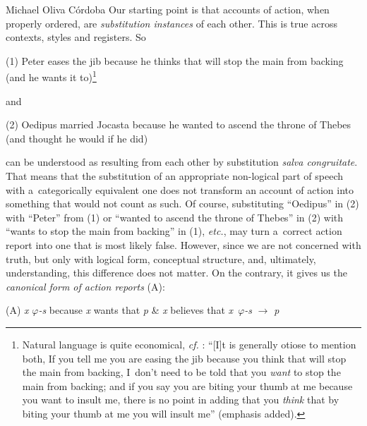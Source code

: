 \begin{artengenv}{Michael Oliva Córdoba}
Our starting point is that accounts of action, when properly ordered, are \textit{substitution instances} of each other. This is true across contexts, styles and registers. So

\medskip

\noindent (1) Peter eases the jib because he thinks that will stop the main from backing (and he wants it to)\footnote{Natural language is quite economical, \textit{cf.} 
\parencite[][6f.]{davidson_1963}: %
 ``[I]t is generally otiose to mention both, If you tell me you are easing the jib because you think that will stop the main from backing, I~don't need to be told that you \textit{want} to stop the main from backing; and if you say you are biting your thumb at me because you want to insult me, there is no point in adding that you \textit{think} that by biting your thumb at me you will insult me'' (emphasis added).}
 
\medskip

\noindent and

\medskip

\noindent (2) Oedipus married Jocasta because he wanted to ascend the throne of Thebes (and thought he would if he did)

\medskip

\noindent can be understood as resulting from each other by substitution \textit{salva congruitate}. That means that the substitution of an appropriate non-logical part of speech with a~categorically equivalent one does not transform an account of action into something that would not count as such. Of course, substituting ``Oedipus'' in (2) with ``Peter'' from (1) or ``wanted to ascend the throne of Thebes'' in (2) with ``wants to stop the main from backing'' in (1), \textit{etc.}, may turn a~correct action report into one that is most likely false. However, since we are not concerned with truth, but only with logical form, conceptual structure, and, ultimately, understanding, this difference does not matter. On the contrary, it gives us the \textit{canonical form of action reports} (A):

\medskip

\noindent (A) \textit{x} \textit{$\varphi $-s} because \textit{x} wants that \textit{p} \& \textit{x} believes that \textit{x~$\varphi $-s} $\to$ \textit{p}

\medskip


\end{artengenv}
